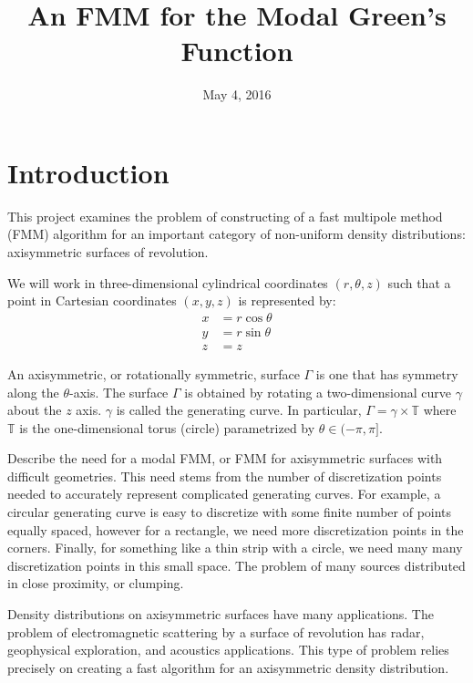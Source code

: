 \documentclass[11pt, oneside]{article}   	%
\title{An FMM for the Modal Green's Function}
\date{May 4, 2016}
\begin{document}
\maketitle

\section{Introduction}
This project examines the problem of constructing of a fast multipole method (FMM) algorithm for an important category of non-uniform density distributions: axisymmetric surfaces of revolution.

We will work in three-dimensional cylindrical coordinates $(r,\theta,z)$ such that a point in Cartesian coordinates $(x,y,z)$ is represented by:
\begin{align*}
x &= r\cos\theta\\
y &= r\sin\theta\\
z &= z
\end{align*}

An axisymmetric, or rotationally symmetric, surface $\Gamma$ is one that has symmetry along the $\theta$-axis. The surface $\Gamma$ is obtained by rotating a two-dimensional curve $\gamma$ about the $z$ axis. $\gamma$ is called the generating curve. In particular, $\Gamma=\gamma\times\mathbb{T}$ where $\mathbb{T}$ is the one-dimensional torus (circle) parametrized by $\theta\in(-\pi,\pi]$.

Describe the need for a modal FMM, or FMM for axisymmetric surfaces with difficult geometries. This need stems from the number of discretization points needed to accurately represent complicated generating curves. For example, a circular generating curve is easy to discretize with some finite number of points equally spaced, however for a rectangle, we need more discretization points in the corners. Finally, for something like a thin strip with a circle, we need many many discretization points in this small space. The problem of many sources distributed in close proximity, or clumping.

Density distributions on axisymmetric surfaces have many applications. The problem of electromagnetic scattering by a surface of revolution has radar, geophysical exploration, and acoustics applications. This type of problem relies precisely on creating a fast algorithm for an axisymmetric density distribution.
\end{document}
